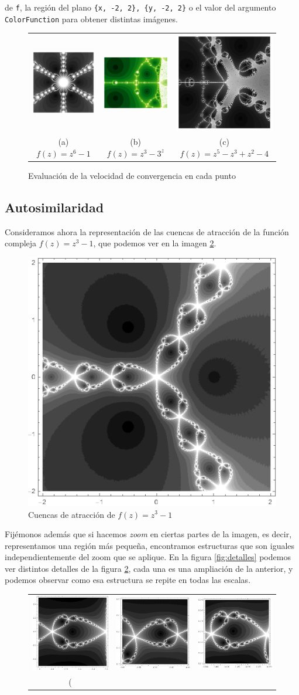  de \verb|f|, la región del plano \verb|{x, -2, 2}, {y, -2, 2}| o el valor del argumento \verb|ColorFunction| para obtener distintas imágenes.

\begin{figure}[ht]
    \centering
    \begin{tabular}{ccc}
      \includegraphics[scale=0.33]{img/cuencas-velocidad-1.png} &   \includegraphics[scale=0.31]{img/cuencas-velocidad-2.png} &   \includegraphics[scale=0.33]{img/cuencas-velocidad-3.png} \\
      (a) $f(z)=z^6-1$ & (b) $f(z)=z^3-3^z$ & (c) $f(z)=z^5-z^3+z^2-4$ \\[6pt]
    \end{tabular}
    \caption{Evaluación de la velocidad de convergencia en cada punto}
    \label{fig:cuencas-velocidad}
\end{figure}

\subsection{Autosimilaridad}
\label{subsection:autosimilaridad}

Consideramos ahora la representación de las cuencas de atracción de la función compleja $f(z)=z^3-1$, que podemos ver en la imagen \ref{fig:cuencas-autosimilaridad}.

\begin{figure} [ht]
\centering
\includegraphics[scale = 0.5]{img/cuencas-autosimilaridad.png}
\caption{Cuencas de atracción de $f(z)=z^3-1$}
    \label{fig:cuencas-autosimilaridad}
\end{figure}

\newpage

Fijémonos además que si hacemos \textit{zoom} en ciertas partes de la imagen, es decir, representamos una región más pequeña, encontramos estructuras que son iguales independientemente del zoom que se aplique. En la figura \ref{fig:detalles} podemos ver distintos detalles de la figura \ref{fig:cuencas-autosimilaridad}, cada una es una ampliación de la anterior, y podemos observar como esa estructura se repite en todas las escalas.


\begin{figure}[ht]
    \begin{tabular}{ccc}
      \includegraphics[scale=0.33]{./img/detalle-1.png} &   \includegraphics[scale=0.33]{./img/detalle-2.png} &   \includegraphics[scale=0.33]{./img/detalle-3.png} \\
    (
\end{tabular}
\end{figure}
